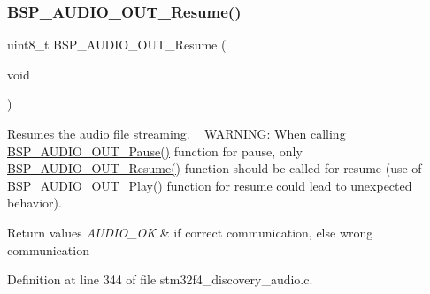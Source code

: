 \subsubsection{\texorpdfstring{B\+S\+P\+\_\+\+A\+U\+D\+I\+O\+\_\+\+O\+U\+T\+\_\+\+Resume()}{BSP\_AUDIO\_OUT\_Resume()}}
{\footnotesize\ttfamily uint8\+\_\+t B\+S\+P\+\_\+\+A\+U\+D\+I\+O\+\_\+\+O\+U\+T\+\_\+\+Resume (\begin{DoxyParamCaption}\item[{void}]{ }\end{DoxyParamCaption})}



Resumes the audio file streaming. ~\newline
W\+A\+R\+N\+I\+NG\+: When calling \mbox{\hyperlink{group___s_t_m32_f4___d_i_s_c_o_v_e_r_y___a_u_d_i_o___o_u_t___private___functions_ga73a0f92b8adbfb2e8207067434c2bfef}{B\+S\+P\+\_\+\+A\+U\+D\+I\+O\+\_\+\+O\+U\+T\+\_\+\+Pause()}} function for pause, only \mbox{\hyperlink{group___s_t_m32_f4___d_i_s_c_o_v_e_r_y___a_u_d_i_o___o_u_t___private___functions_ga064f0eddd4ab25a33fd1fe83af429c9f}{B\+S\+P\+\_\+\+A\+U\+D\+I\+O\+\_\+\+O\+U\+T\+\_\+\+Resume()}} function should be called for resume (use of \mbox{\hyperlink{group___s_t_m32_f4___d_i_s_c_o_v_e_r_y___a_u_d_i_o___o_u_t___private___functions_gaa415fdd481a01468fdfcd9d91f0f6711}{B\+S\+P\+\_\+\+A\+U\+D\+I\+O\+\_\+\+O\+U\+T\+\_\+\+Play()}} function for resume could lead to unexpected behavior). 


\begin{DoxyRetVals}{Return values}
{\em A\+U\+D\+I\+O\+\_\+\+OK} & if correct communication, else wrong communication \\
\hline
\end{DoxyRetVals}


Definition at line 344 of file stm32f4\+\_\+discovery\+\_\+audio.\+c.

\mbox{\label{group___s_t_m32_f4___d_i_s_c_o_v_e_r_y___a_u_d_i_o___o_u_t___private___functions_gaf9159656c0f4dde08c62334a25d4b106}} 
